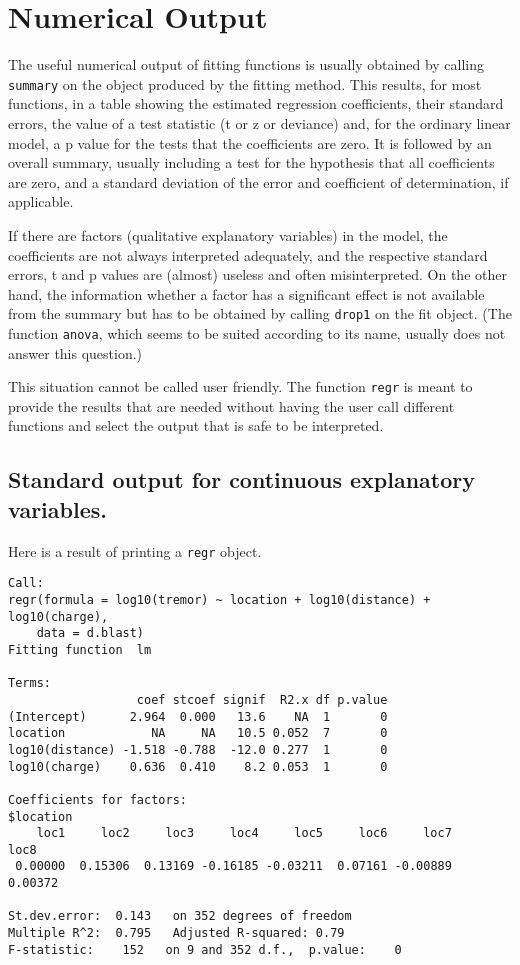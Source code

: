\documentclass{article}
\providecommand{\T}{\texttt}
\begin{document}
\section{Numerical Output}
The useful numerical output of fitting functions is usually obtained by
calling \T{summary} on the object produced by the fitting method.
This results, for most functions, in a table showing the estimated
regression coefficients, their standard errors, the value of a test
statistic (t or z or deviance) and, for the 
ordinary linear model, a p value for the tests that the coefficients are
zero. It is followed by an overall summary, usually including a test for
the hypothesis that all coefficients are zero, and a standard deviation of
the error and coefficient of determination, if applicable.

If there are factors (qualitative explanatory variables) in the model, 
the coefficients are not always interpreted adequately, and the 
respective standard errors, t and p values are (almost) useless and often
misinterpreted. 
On the other hand, the information whether a factor has a significant
effect is not available from the summary but has to be obtained by calling 
\T{drop1} on the fit object. 
(The function \T{anova}, which seems to be suited according to its
name, usually does not answer this question.)

This situation cannot be called user friendly.
The function \T{regr} is meant to provide the results that are needed
without having the user call different functions and select the 
output that is safe to be interpreted.

\subsection{Standard output for continuous explanatory variables.}
Here is a result of printing a \T{regr} object.
\begin{verbatim}
Call:
regr(formula = log10(tremor) ~ location + log10(distance) + log10(charge), 
    data = d.blast)
Fitting function  lm

Terms:
                  coef stcoef signif  R2.x df p.value
(Intercept)      2.964  0.000   13.6    NA  1       0
location            NA     NA   10.5 0.052  7       0
log10(distance) -1.518 -0.788  -12.0 0.277  1       0
log10(charge)    0.636  0.410    8.2 0.053  1       0

Coefficients for factors:
$location
    loc1     loc2     loc3     loc4     loc5     loc6     loc7     loc8 
 0.00000  0.15306  0.13169 -0.16185 -0.03211  0.07161 -0.00889  0.00372 

St.dev.error:  0.143   on 352 degrees of freedom
Multiple R^2:  0.795   Adjusted R-squared: 0.79 
F-statistic:    152   on 9 and 352 d.f.,  p.value:    0 
\end{verbatim}
\end{document}
